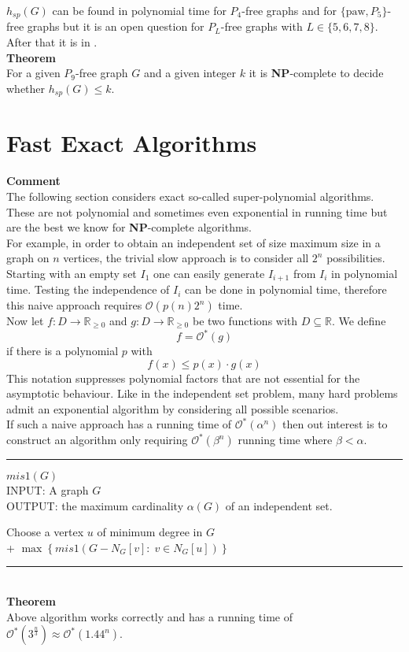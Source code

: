 \documentclass[a4paper, 12pt]{article}
\begin{document}
	$h_{sp}(G)$ can be found in polynomial time for $P_4$-free graphs and for $\{\text{paw}, P_5\}$-free graphs but it is an open question for $P_L$-free graphs with $L \in \{5,6,7,8\}$. After that it is in .\\
	\textbf{Theorem}\\
	For a given $P_9$-free graph $G$ and a given integer $k$ it is \textbf{NP}-complete to decide whether $h_{sp}(G) \leq k$.
	\section{Fast Exact Algorithms}
	\textbf{Comment}\\
	The following section considers exact so-called super-polynomial algorithms. These are not polynomial and sometimes even exponential in running time but are the best we know for \textbf{NP}-complete algorithms.\\
	
	For example, in order to obtain an independent set of size maximum size in a graph on $n$ vertices, the trivial slow approach is to consider all $2^n$ possibilities.\\
	Starting with an empty set $I_1$ one can easily generate $I_{i+1}$ from $I_i$ in polynomial time. Testing the independence of $I_i$ can be done in polynomial time, therefore this naive approach requires $\mathcal{O}(p(n)2^n)$ time.\\
	
	Now let $f:D \to \mathbb{R}_{\geq 0}$ and $g: D \to \mathbb{R}_{\geq 0}$ be two functions with $D \subseteq \mathbb{R}$. We define \[f = \mathcal{O}^*(g)\] if there is a polynomial $p$ with \[f(x) \leq p(x) \cdot g(x)\]
	This notation suppresses polynomial factors that are not essential for the asymptotic behaviour. Like in the independent set problem, many hard problems admit an exponential algorithm by considering all possible scenarios.\\
	If such a naive approach has a running time of $\mathcal{O}^*(\alpha^n)$ then out interest is to construct an algorithm only requiring $\mathcal{O}^*(\beta^n)$ running time where $\beta < \alpha$.
	\par\noindent\rule{\textwidth}{0.4pt}
	\underline{$mis1(G)$}\\
	INPUT: A graph $G$\\
	OUTPUT: the maximum cardinality $\alpha(G)$ of an independent set.
	\begin{algorithmic}[1]
		\EndIf
		\State Choose a vertex $u$ of minimum degree in $G$\\
		+ $\max\left\{mis1(G - N_G[v]: \; v \in N_G[u])\right\}$
	\end{algorithmic}
	\par\noindent\rule{\textwidth}{0.4pt}\\
	\textbf{Theorem}\\
	Above algorithm works correctly and has a running time of $\mathcal{O}^*(3^{\frac{n}{3}}) \approx \mathcal{O}^*(1.44^n)$.\\
	
\end{document}
